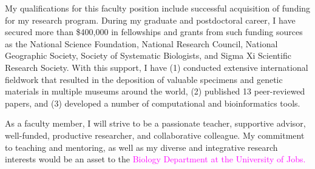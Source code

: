 \documentclass[letterpaper, 10pt]{letter}
\newcommand{\highlight}[1]{\textcolor{magenta}{#1}}
\begin{document}
\begin{letter}


My qualifications for this faculty position include successful acquisition
of funding for my research program.
During my graduate and postdoctoral career, I have secured more than
\$400,000 in fellowships and grants from such funding sources as the 
National Science Foundation,
National Research Council,
National Geographic Society,
Society of Systematic Biologists, and
Sigma Xi Scientific Research Society.
With this support, I have
(1) conducted extensive international fieldwork that resulted in
the deposition of valuable specimens and genetic materials in multiple
museums around the world,
(2) published 13 peer-reviewed papers, and
(3) developed a number of computational and bioinformatics tools.



As a faculty member, I will strive to be a passionate teacher, supportive
advisor, well-funded, productive researcher, and collaborative colleague.
My commitment to teaching and mentoring, as well as my diverse and integrative
research interests would be an asset to the
\highlight{
Biology Department
at
the University of Jobs.
}


\end{letter}
\end{document}
